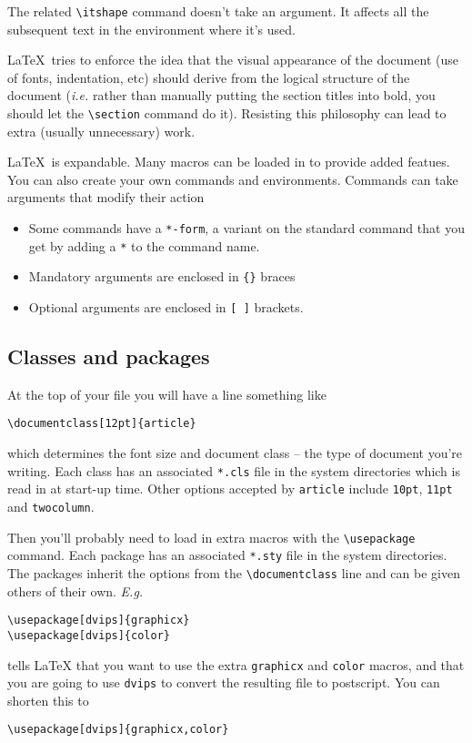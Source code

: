 \documentclass[dvips]{article}
\begin{document}
The related \verb|\itshape| command doesn't take an argument. It affects 
all the subsequent text in the environment where it's used.

\LaTeX\ tries to enforce the idea that the visual appearance of
the document (use of fonts, indentation, etc) should derive from the 
logical structure of the document (\textit{i.e.} rather than manually
putting the section titles into bold, you should let the \verb|\section|
command do it). Resisting this philosophy can lead to
extra (usually unnecessary) work.

\LaTeX\  is expandable. Many macros can be loaded in to provide added
featues. You can also create your own commands and environments. Commands
can take arguments that modify their action 
\begin{itemize}
\item Some commands have a \texttt{*-form}, a variant on the standard command
that you get by adding a \texttt{*} to the command name.

\item Mandatory arguments are enclosed in \verb|{}| braces
\item Optional arguments are enclosed in \verb|[ ]| brackets.  
\end{itemize}

\subsection{Classes and packages}
At the top of your file you will have a line something like
\begin{verbatim}
\documentclass[12pt]{article}
\end{verbatim}
which determines the font size and document 
class -- the type of document you're writing. 
Each class has an associated \verb|*.cls| file in the system directories
which is read in at 
start-up time.
Other options accepted
by \texttt{article} include \texttt{10pt}, \texttt{11pt} and 
\texttt{twocolumn}. 

Then you'll probably need to load in extra macros with the 
\verb|\usepackage| command. Each package has  an associated 
\verb|*.sty| file in the system directories. The packages 
inherit the options from the \verb|\documentclass| line and can be
given others of their own. \emph{E.g.}
\begin{verbatim}
\usepackage[dvips]{graphicx}
\usepackage[dvips]{color}
\end{verbatim}
tells \LaTeX{} that you want to use the extra \texttt{graphicx} and
\texttt{color} macros, and that you are going to use  \texttt{dvips}
to convert the resulting file to postscript. You can shorten this to
\begin{verbatim}
\usepackage[dvips]{graphicx,color}
\end{verbatim}
\end{document}
